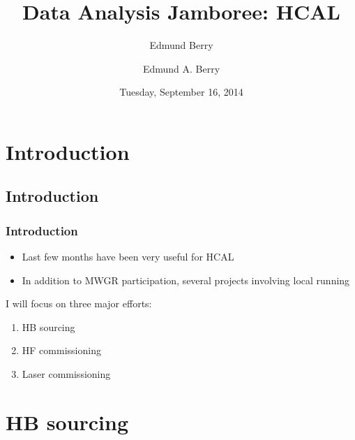 \documentclass[bigger]{beamer}
\institute[Brown University]{}
\title{Data Analysis Jamboree: HCAL}
\author{Edmund Berry}
\date{Tuesday, September 16, 2014}
\author[Edmund A. Berry]{\alert{Edmund A. Berry}}
\begin{document}
\maketitle


\section{Introduction}
\label{sec-1}
\subsection{Introduction}
\label{sec-1-1}
\begin{frame}
\frametitle{Introduction}
\label{sec-1-1-1}
\begin{itemize}

\item Last few months have been very useful for HCAL
\label{sec-1-1-1-1}%

\item In addition to MWGR participation, several projects involving local running
\label{sec-1-1-1-2}%
\end{itemize} %
\begin{block}{I will focus on three major efforts:}
\label{sec-1-1-1-3}

\begin{enumerate}
\item HB sourcing
\item HF commissioning
\item Laser commissioning
\end{enumerate}
\end{block}
\end{frame}
\section{HB sourcing}
\label{sec-2}
\end{document}
